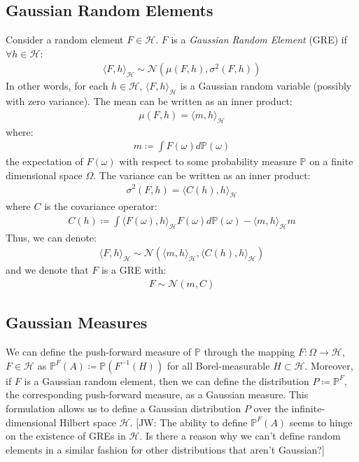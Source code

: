 \documentclass[twoside,11pt]{article}
\newcommand{\jw}[1]{{\color{gray} [JW: #1]}}
\begin{document}
\subsection{Gaussian Random Elements}
 Consider a random element $F \in \mathcal{H}$. $F$ is a \textit{Gaussian Random Element} (GRE) if $\forall h \in \mathcal{H}$:
\begin{align}
    \langle F, h \rangle_\mathcal{H} \sim \mathcal{N}(\mu(F, h), \sigma^2(F, h))
\end{align}
In other words, for each $h \in \mathcal{H}$, $\langle F, h \rangle_\mathcal{H}$ is a Gaussian random variable (possibly with zero variance). The mean can be written as an inner product:
\begin{align}
\mu(F, h) = \langle m, h\rangle_{\mathcal{H}}
\end{align}
where:
\begin{align}
    m \coloneqq \int F(\omega) d \mathbb{P}(\omega)
\end{align}
the expectation of $F(\omega)$ with respect to some probability measure $\mathbb{P}$ on a finite dimensional space $\Omega$. The variance can be written as an inner product:
\begin{align}
\sigma^2(F, h) = \langle C(h), h\rangle_{\mathcal{H}}
\end{align}
where $C$ is the covariance operator:
\begin{align}
    C(h) \coloneqq \int \langle F(\omega), h\rangle_{\mathcal{H}} F(\omega)d \mathbb{P}(\omega) - \langle m, h\rangle_{\mathcal{H}} m 
\end{align}
Thus, we can denote:
\begin{align}
    \langle F, h\rangle_{\mathcal{H}} \sim \mathcal{N}\left(  \langle m, h\rangle_{\mathcal{H}},  \langle C(h), h\rangle_{\mathcal{H}}\right)
\end{align}
and we denote that $F$ is a GRE with:
\begin{align}
    F \sim \mathcal{N}(m, C)
\end{align}
\subsection{Gaussian Measures \cite{wild2022generalized}}
We can define the push-forward measure of $\mathbb{P}$ through the mapping $F: \Omega \rightarrow \mathcal{H}$, $F \in \mathcal{H}$ as $\mathbb{P}^{F}(A) \coloneqq \mathbb{P}(F^{-1}(H))$ for all Borel-measurable $H \subset \mathcal{H}$. Moreover, if $F$ is a Gaussian random element, then we can define the distribution $P \coloneqq \mathbb{P}^{F}$, the corresponding push-forward measure, as a Gaussian measure. This formulation allows us to define a Gaussian distribution $P$ over the infinite-dimensional Hilbert space $\mathcal{H}$. \jw{The ability to define $\mathbb{P}^{F}(A)$ seems to hinge on the existence of GREs in $\mathcal{H}$. Is there a reason why we can't define random elements in a similar fashion for other distributions that aren't Gaussian?}
\end{document}
